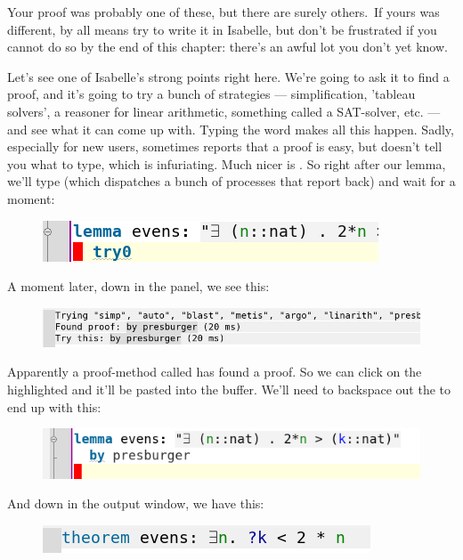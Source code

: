 Your proof was probably one of these, but there are surely others. If yours was different, by all means try to write it in Isabelle, but don't be frustrated if you cannot do so by the end of this chapter: there's an awful lot you don't yet know. 

Let's see one of Isabelle's strong points right here. We're going to ask it to find a proof, and it's going to try a bunch of strategies --- simplification, 'tableau solvers', a reasoner for linear arithmetic, something called a SAT-solver, etc. --- and see what it can come up with. Typing the word  makes all this happen. Sadly, especially for new users,  sometimes reports that a proof is easy, but doesn't tell you what to type, which is infuriating. Much nicer is . So right after our lemma, we'll type  (which dispatches a bunch of processes that report back) and wait for a moment:
\begin{figure}[h]
    \includegraphics[width=0.5\linewidth]{TEXT/C01//Images/try0.png}
\end{figure}

A moment later, down in the  panel, we see this:
\begin{figure}[H]
    \includegraphics[width=0.75\linewidth]{TEXT/C01//Images/try0-results.png}
\end{figure}

Apparently a proof-method called  has found a proof. So we can click on the highlighted  and it'll be pasted into the buffer. We'll need to backspace out the  to end up with this:
\begin{figure}[h]
    \includegraphics[width=0.5\linewidth]{TEXT/C01/Images/first-proof.png}
\end{figure}
And down in the output window, we have this:
\begin{figure}[h]
    \includegraphics[width=0.5\linewidth]{output-first-proof.png}
\end{figure}

